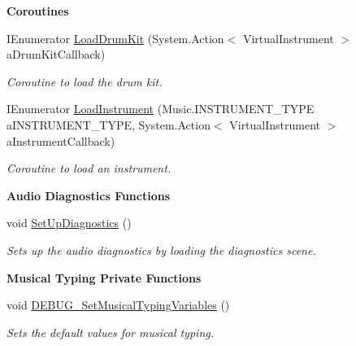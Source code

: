 \begin{Indent}\textbf{ Coroutines}\par
\begin{DoxyCompactItemize}
\item 
I\+Enumerator \hyperlink{group___virtual_instrument_manager_aba165ca4757b6c8555914fe6b42b638d}{Load\+Drum\+Kit} (System.\+Action$<$ Virtual\+Instrument $>$ a\+Drum\+Kit\+Callback)
\begin{DoxyCompactList}\small\item\em Coroutine to load the drum kit. \end{DoxyCompactList}\item 
I\+Enumerator \hyperlink{group___virtual_instrument_manager_ab8082c1cc590771bf57da8b5ae8603d1}{Load\+Instrument} (Music.\+I\+N\+S\+T\+R\+U\+M\+E\+N\+T\+\_\+\+T\+Y\+PE a\+I\+N\+S\+T\+R\+U\+M\+E\+N\+T\+\_\+\+T\+Y\+PE, System.\+Action$<$ Virtual\+Instrument $>$ a\+Instrument\+Callback)
\begin{DoxyCompactList}\small\item\em Coroutine to load an instrument. \end{DoxyCompactList}\end{DoxyCompactItemize}
\end{Indent}
\begin{Indent}\textbf{ Audio Diagnostics Functions}\par
\begin{DoxyCompactItemize}
\item 
\mbox{\label{group___virtual_instrument_manager_a3d7a09ee882f5d4d1f1e2ba2b2a7f65d}} 
void \hyperlink{group___virtual_instrument_manager_a3d7a09ee882f5d4d1f1e2ba2b2a7f65d}{Set\+Up\+Diagnostics} ()
\begin{DoxyCompactList}\small\item\em Sets up the audio diagnostics by loading the diagnostics scene. \end{DoxyCompactList}\end{DoxyCompactItemize}
\end{Indent}
\begin{Indent}\textbf{ Musical Typing Private Functions}\par
\begin{DoxyCompactItemize}
\item 
void \hyperlink{group___audio_testing_gaa89d7c493c1101b1efd6662c94598d32}{D\+E\+B\+U\+G\+\_\+\+Set\+Musical\+Typing\+Variables} ()
\begin{DoxyCompactList}\small\item\em Sets the default values for musical typing. \end{DoxyCompactList}\end{DoxyCompactItemize}
\end{Indent}
